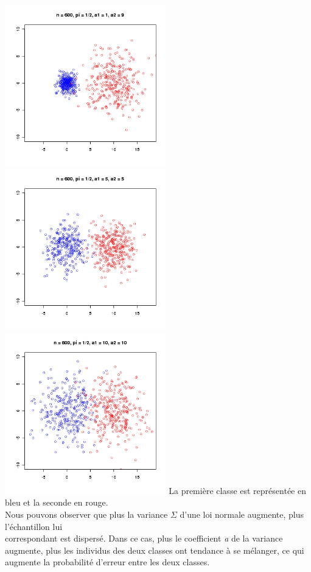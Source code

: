 \documentclass[a4paper, 10pt]{article}
\begin{document}
\includegraphics[height = 7cm, width = 7cm]{plots/plot_simul_3.png}
\includegraphics[height = 7cm, width = 7cm]{plots/plot_simul_4.png}\\
\includegraphics[height = 7cm, width = 7cm]{plots/plot_simul_5.png}
\newpage
\noindent
La première classe est représentée en bleu et la seconde en rouge.\\
Nous pouvons observer que plus la variance $\Sigma$ d'une loi normale augmente, plus l'échantillon lui\\correspondant est dispersé.
Dans ce cas, plus le coefficient \textit{a} de la variance augmente, plus les individus des deux classes ont tendance à se mélanger,
ce qui augmente la probabilité d'erreur entre les deux classes.\\ \\
\end{document}
